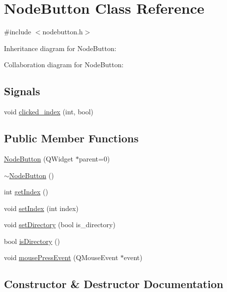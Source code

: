 \hypertarget{class_node_button}{}\section{Node\+Button Class Reference}
\label{class_node_button}


{\ttfamily \#include $<$nodebutton.\+h$>$}



Inheritance diagram for Node\+Button\+:


Collaboration diagram for Node\+Button\+:
\subsection*{Signals}
\begin{DoxyCompactItemize}
\item 
void \hyperlink{class_node_button_a134c0feb71669c042adc54244735e1a3}{clicked\+\_\+index} (int, bool)
\end{DoxyCompactItemize}
\subsection*{Public Member Functions}
\begin{DoxyCompactItemize}
\item 
\hyperlink{class_node_button_a5078f1941fadec2e8cdd61550fe19c3a}{Node\+Button} (Q\+Widget $\ast$parent=0)
\item 
\hyperlink{class_node_button_a7554d68feec1f8732ff8eee988e8d3ff}{$\sim$\+Node\+Button} ()
\item 
int \hyperlink{class_node_button_ae08a2ff81cb8e86985ef2da8562d4d7f}{get\+Index} ()
\item 
void \hyperlink{class_node_button_a982a450f8673e767e1b7ad664f36e7ee}{set\+Index} (int index)
\item 
void \hyperlink{class_node_button_a83cd540f820ed201bc9d648cbfa0c51b}{set\+Directory} (bool is\+\_\+directory)
\item 
bool \hyperlink{class_node_button_a37f86315d2ebb66352a420a35a6c8fb6}{is\+Directory} ()
\item 
void \hyperlink{class_node_button_a2c448d205022ecd0e5a5c23f804f2653}{mouse\+Press\+Event} (Q\+Mouse\+Event $\ast$event)
\end{DoxyCompactItemize}


\subsection{Constructor \& Destructor Documentation}
\hypertarget{class_node_button_a5078f1941fadec2e8cdd61550fe19c3a}{}
